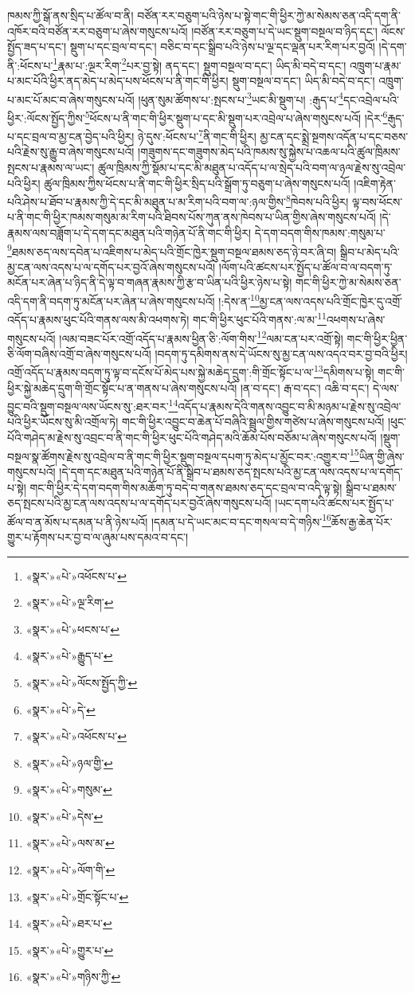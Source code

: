 ཁམས་ཀྱི་སྒོ་ནས་སྲིད་པ་ཚོལ་བ་ནི། བཙོན་རར་བཅུག་པའི་ཉེས་པ་སྟེ་གང་གི་ཕྱིར་ཀྱེ་མ་སེམས་ཅན་འདི་དག་ནི་འཁོར་བའི་བཙོན་རར་བཅུག་པ་ཞེས་གསུངས་པའོ། །བཙོན་རར་བཅུག་པ་དེ་ཡང་སྡུག་བསྔལ་བ་ཉིད་དང་། ལོངས་སྤྱོད་ཟད་པ་དང་། སྡུག་པ་དང་བྲལ་བ་དང་། བཅིང་བ་དང་སྒྲིབ་པའི་ཉེས་པ་ལྔ་དང་ལྡན་པར་རིག་པར་བྱའོ། །དེ་དག་ནི་:ཕོངས་པ་\footnote{«སྣར་»«པེ་»འཕོངས་པ་}རྣམ་པ་:ལྔར་རིག་\footnote{«སྣར་»«པེ་»ལྔ་རིག་}པར་བྱ་སྟེ། ནད་དང་། སྡུག་བསྔལ་བ་དང་། ཡིད་མི་བདེ་བ་དང་། འཁྲུག་པ་རྣམ་པ་མང་པོའི་ཕྱིར་ནད་མེད་པ་མེད་པས་ཕོངས་པ་ནི་གང་གི་ཕྱིར། སྡུག་བསྔལ་བ་དང་། ཡིད་མི་བདེ་བ་དང་། འཁྲུག་པ་མང་པོ་མང་བ་ཞེས་གསུངས་པའོ། །ཕུན་སུམ་ཚོགས་པ་:སྤངས་པ་\footnote{«སྣར་»«པེ་»ཕངས་པ་}ཡང་མི་སྡུག་པ། :རྒུད་པ་\footnote{«སྣར་»«པེ་»རྒྱུད་པ་}དང་འབྲེལ་པའི་ཕྱིར་:ལོངས་སྤྱོད་ཀྱིས་\footnote{«སྣར་»«པེ་»ལོངས་སྤྱོད་ཀྱི་}ཕོངས་པ་ནི་གང་གི་ཕྱིར་སྡུག་པ་དང་མི་སྡུག་པར་འབྲེལ་པ་ཞེས་གསུངས་པའོ། །དེར་\footnote{«སྣར་»«པེ་»དེ་}རྒུད་པ་དང་བྲལ་བ་མྱ་ངན་བྱེད་པའི་ཕྱིར། ཉེ་དུས་:ཕོངས་པ་\footnote{«སྣར་»«པེ་»འཕོངས་པ་}ནི་གང་གི་ཕྱིར། མྱ་ངན་དང་སྨྲེ་སྔགས་འདོན་པ་དང་བཅས་པའི་རྗེས་སུ་རྒྱུ་བ་ཞེས་གསུངས་པའོ། །གཟུགས་དང་གཟུགས་མེད་པའི་ཁམས་སུ་སྐྱེས་པ་འཆལ་པའི་ཚུལ་ཁྲིམས་སྤངས་པ་རྣམས་ལ་ཡང་། ཚུལ་ཁྲིམས་ཀྱི་སྡོམ་པ་དང་མི་མཐུན་པ་འདོད་པ་ལ་སྲེད་པའི་བག་ལ་ཉལ་རྗེས་སུ་འབྲེལ་པའི་ཕྱིར། ཚུལ་ཁྲིམས་ཀྱིས་ཕོངས་པ་ནི་གང་གི་ཕྱིར་སྲིད་པའི་སྒྲོག་ཏུ་བཅུག་པ་ཞེས་གསུངས་པའོ། །འཇིག་རྟེན་པའི་ཤེས་པ་ཐོབ་པ་རྣམས་ཀྱི་དེ་དང་མི་མཐུན་པ་མ་རིག་པའི་བག་ལ་:ཉལ་གྱིས་\footnote{«སྣར་»«པེ་»ཉལ་གྱི་}ཁེབས་པའི་ཕྱིར། ལྟ་བས་ཕོངས་པ་ནི་གང་གི་ཕྱིར་ཁམས་གསུམ་མ་རིག་པའི་ཐིབས་པོས་ཀུན་ནས་ཁེབས་པ་ཡིན་གྱིས་ཞེས་གསུངས་པའོ། །དེ་རྣམས་ལས་བཟློག་པ་དེ་དག་དང་མཐུན་པའི་གཉེན་པོ་ནི་གང་གི་ཕྱིར། དེ་དག་བདག་གིས་ཁམས་:གསུམ་པ་\footnote{«སྣར་»«པེ་»གསུམ་}ཐམས་ཅད་ལས་དབེན་པ་འཇིགས་པ་མེད་པའི་གྲོང་ཁྱེར་སྡུག་བསྔལ་ཐམས་ཅད་ཉེ་བར་ཞི་བ། སྒྲིབ་པ་མེད་པའི་མྱ་ངན་ལས་འདས་པ་ལ་དགོད་པར་བྱའོ་ཞེས་གསུངས་པའོ། །ལོག་པའི་ཚངས་པར་སྤྱོད་པ་ཚོལ་བ་ལ་བདག་ཏུ་མངོན་པར་ཞེན་པ་ཉིད་ནི་དེ་ལྟ་བ་གཞན་རྣམས་ཀྱི་རྩ་བ་ཡིན་པའི་ཕྱིར་ཉེས་པ་སྟེ། གང་གི་ཕྱིར་ཀྱེ་མ་སེམས་ཅན་འདི་དག་ནི་བདག་ཏུ་མངོན་པར་ཞེན་པ་ཞེས་གསུངས་པའོ། །:དེས་ན་\footnote{«སྣར་»«པེ་»དེས་}མྱ་ངན་ལས་འདས་པའི་གྲོང་ཁྱེར་དུ་འགྲོ་འདོད་པ་རྣམས་ཕུང་པོའི་གནས་ལས་མི་འཕགས་ཏེ། གང་གི་ཕྱིར་ཕུང་པོའི་གནས་:ལ་མ་\footnote{«སྣར་»«པེ་»ལས་མ་}འཕགས་པ་ཞེས་གསུངས་པའོ། །ལམ་བཟང་པོར་འགྲོ་འདོད་པ་རྣམས་ཕྱིན་ཅི་:ལོག་གིས་\footnote{«སྣར་»«པེ་»ལོག་གི་}ལམ་ངན་པར་འགྲོ་སྟེ། གང་གི་ཕྱིར་ཕྱིན་ཅི་ལོག་བཞིས་འགྲོ་བ་ཞེས་གསུངས་པའོ། །བདག་ཏུ་དམིགས་ནས་དེ་ཡོངས་སུ་མྱ་ངན་ལས་འདའ་བར་བྱ་བའི་ཕྱིར། འགྲོ་འདོད་པ་རྣམས་བདག་ཏུ་ལྟ་བ་དངོས་པོ་མེད་པས་སྐྱེ་མཆེད་དྲུག་:གི་གྲོང་སྟོང་པ་ལ་\footnote{«སྣར་»«པེ་»གྲོང་སྟོང་པ་}དམིགས་པ་སྟེ། གང་གི་ཕྱིར་སྐྱེ་མཆེད་དྲུག་གི་གྲོང་སྟོང་པ་ན་གནས་པ་ཞེས་གསུངས་པའོ། །ན་བ་དང་། རྒ་བ་དང་། འཆི་བ་དང་། དེ་ལས་བྱུང་བའི་སྡུག་བསྔལ་ལས་ཡོངས་སུ་:ཐར་བར་\footnote{«སྣར་»«པེ་»ཐར་པ་}འདོད་པ་རྣམས་དེའི་གནས་འབྱུང་བ་མི་མཉམ་པ་རྗེས་སུ་འབྲེལ་པའི་ཕྱིར་ཡོངས་སུ་མི་འགྲོལ་ཏེ། གང་གི་ཕྱིར་འབྱུང་བ་ཆེན་པོ་བཞིའི་སྦྲུལ་གྱིས་གཙེས་པ་ཞེས་གསུངས་པའོ། །ཕུང་པོའི་གཤེད་མ་རྗེས་སུ་འབྲང་བ་ནི་གང་གི་ཕྱིར་ཕུང་པོའི་གཤེད་མའི་ཆོམ་པོས་བཅོམ་པ་ཞེས་གསུངས་པའོ། །སྡུག་བསྔལ་སྣ་ཚོགས་རྗེས་སུ་འབྲེལ་བ་ནི་གང་གི་ཕྱིར་སྡུག་བསྔལ་དཔག་ཏུ་མེད་པ་མྱོང་བར་:འགྱུར་བ་\footnote{«སྣར་»«པེ་»གྱུར་པ་}ཡིན་གྱི་ཞེས་གསུངས་པའོ། །དེ་དག་དང་མཐུན་པའི་གཉེན་པོ་ནི་སྒྲིབ་པ་ཐམས་ཅད་སྤངས་པའི་མྱ་ངན་ལས་འདས་པ་ལ་དགོད་པ་སྟེ། གང་གི་ཕྱིར་དེ་དག་བདག་གིས་མཆོག་ཏུ་བདེ་བ་གནས་ཐམས་ཅད་དང་བྲལ་བ་འདི་ལྟ་སྟེ། སྒྲིབ་པ་ཐམས་ཅད་སྤངས་པའི་མྱ་ངན་ལས་འདས་པ་ལ་དགོད་པར་བྱའོ་ཞེས་གསུངས་པའོ། །ཡང་དག་པའི་ཚངས་པར་སྤྱོད་པ་ཚོལ་བ་ན་མོས་པ་དམན་པ་ནི་ཉེས་པའོ། །དམན་པ་དེ་ཡང་མང་བ་དང་གསལ་བ་དེ་གཉིས་\footnote{«སྣར་»«པེ་»གཉིས་ཀྱི་}ཆོས་རྒྱ་ཆེན་པོར་གྱུར་པ་རྟོགས་པར་བྱ་བ་ལ་ཞུམ་པས་དམའ་བ་དང་། 